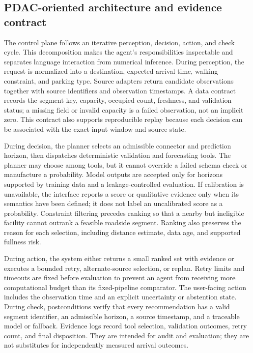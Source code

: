 \documentclass[conference,letterpaper,10pt]{IEEEtran}
\begin{document}
\subsection{PDAC-oriented architecture and evidence contract}
The control plane follows an iterative perception, decision, action, and check cycle. This decomposition makes the agent's responsibilities inspectable and separates language interaction from numerical inference. During perception, the request is normalized into a destination, expected arrival time, walking constraint, and parking type. Source adapters return candidate observations together with source identifiers and observation timestamps. A data contract records the segment key, capacity, occupied count, freshness, and validation status; a missing field or invalid capacity is a failed observation, not an implicit zero. This contract also supports reproducible replay because each decision can be associated with the exact input window and source state.

During decision, the planner selects an admissible connector and prediction horizon, then dispatches deterministic validation and forecasting tools. The planner may choose among tools, but it cannot override a failed schema check or manufacture a probability. Model outputs are accepted only for horizons supported by training data and a leakage-controlled evaluation. If calibration is unavailable, the interface reports a score or qualitative evidence only when its semantics have been defined; it does not label an uncalibrated score as a probability. Constraint filtering precedes ranking so that a nearby but ineligible facility cannot outrank a feasible roadside segment. Ranking also preserves the reason for each selection, including distance estimate, data age, and supported fullness risk.

During action, the system either returns a small ranked set with evidence or executes a bounded retry, alternate-source selection, or replan. Retry limits and timeouts are fixed before evaluation to prevent an agent from receiving more computational budget than its fixed-pipeline comparator. The user-facing action includes the observation time and an explicit uncertainty or abstention state. During check, postconditions verify that every recommendation has a valid segment identifier, an admissible horizon, a source timestamp, and a traceable model or fallback. Evidence logs record tool selection, validation outcomes, retry count, and final disposition. They are intended for audit and evaluation; they are not substitutes for independently measured arrival outcomes.
\end{document}
